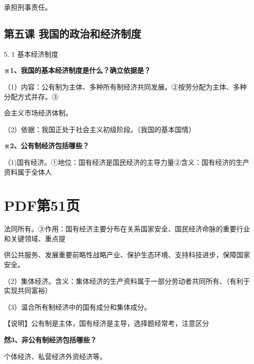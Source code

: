 \documentclass[lang=cn,11pt]{elegantbook}
\newcommand{\daofasym}[1]{{\daofasymbolfont #1}}
\newcommand{\daofasym}[1]{#1}
\begin{document}
承担刑事责任。\par

\subsection*{第五课 我国的政治和经济制度}

5. 1 基本经济制度\par

\textbf{※1、我国的基本经济制度是什么？确立依据是？}\par

（1）内容：公有制为主体、多种所有制经济共同发展。\daofasym{②}按劳分配为主体、多种分配方式并存。\daofasym{③}\par

会主义市场经济体制。\par

（2）依据：我国正处于社会主义初级阶段。（我国的基本国情）\par

\textbf{※2、公有制经济包括哪些？}\par

（1)国有经济。\daofasym{①}地位：国有经济是国民经济的主导力量\daofasym{②}含义：国有经济的生产资料属于全体人\par


\section*{PDF第51页}

法同所有。\daofasym{③}作用：国有经济主要分布在关系国家安全、国民经济命脉的重要行业和关键领域、重点提\par

供公共服务、发展重要前略性战略产业、保护生态环境、支持科技进步，保障国家安全。\par

（2）集体经济。含义：集体经济的生产资料属于一部分劳动者共同所有、（有利于实现共同富裕）\par

（3）温合所有制经济中的国有成分和集体成分。\par

【说明】公有制是主体，国有经济是主导，选择题经常考，注意区分\par

\textbf{然3、非公有制经济包括哪些？}\par

个体经济、私营经济外资经济等。\par
\end{document}
